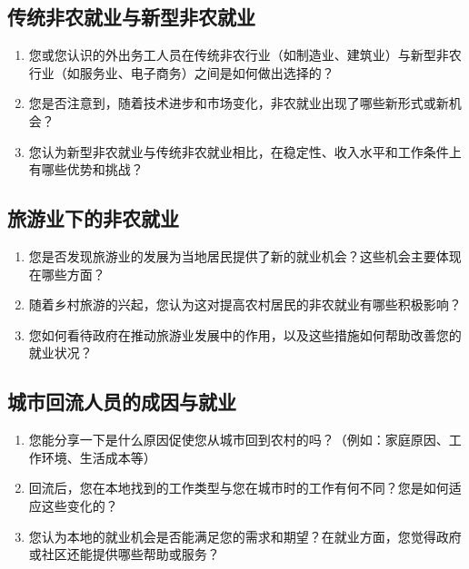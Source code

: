 \documentclass[12pt]{article}
\begin{document}
\subsection*{传统非农就业与新型非农就业}
\begin{enumerate}
    \item 您或您认识的外出务工人员在传统非农行业（如制造业、建筑业）与新型非农行业（如服务业、电子商务）之间是如何做出选择的？
    \item 您是否注意到，随着技术进步和市场变化，非农就业出现了哪些新形式或新机会？
    \item 您认为新型非农就业与传统非农就业相比，在稳定性、收入水平和工作条件上有哪些优势和挑战？
\end{enumerate}

\subsection*{旅游业下的非农就业}
\begin{enumerate}
    \item 您是否发现旅游业的发展为当地居民提供了新的就业机会？这些机会主要体现在哪些方面？
    \item 随着乡村旅游的兴起，您认为这对提高农村居民的非农就业有哪些积极影响？
    \item 您如何看待政府在推动旅游业发展中的作用，以及这些措施如何帮助改善您的就业状况？
\end{enumerate}

\subsection*{城市回流人员的成因与就业}
\begin{enumerate}
    \item 您能分享一下是什么原因促使您从城市回到农村的吗？（例如：家庭原因、工作环境、生活成本等）
    \item 回流后，您在本地找到的工作类型与您在城市时的工作有何不同？您是如何适应这些变化的？
    \item 您认为本地的就业机会是否能满足您的需求和期望？在就业方面，您觉得政府或社区还能提供哪些帮助或服务？
\end{enumerate}
\end{document}
